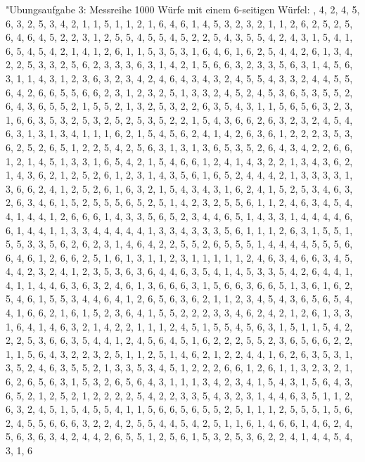\documentclass[fleqn,a4paper,12pt]{article}
\begin{document}
  "Ubungsaufgabe 3: \newline
  Messreihe 1000 Würfe mit einem 6-seitigen Würfel: , 4, 2, 4, 5, 6, 3, 2, 5, 3, 4, 2, 1, 1, 5, 1, 1, 2, 1, 6, 4, 6, 1, 4, 5, 3, 2, 3, 2, 1, 1, 2, 6, 2, 5, 2, 5, 6, 4, 6, 4, 5, 2, 2, 3, 1, 2, 5, 5, 4, 5, 5, 4, 5, 2, 2, 5, 4, 3, 5, 5, 4, 2, 4, 3, 1, 5, 4, 1, 6, 5, 4, 5, 4, 2, 1, 4, 1, 2, 6, 1, 1, 5, 3, 5, 3, 1, 6, 4, 6, 1, 6, 2, 5, 4, 4, 2, 6, 1, 3, 4, 2, 2, 5, 3, 3, 2, 5, 6, 2, 3, 3, 3, 6, 3, 1, 4, 2, 1, 5, 6, 6, 3, 2, 3, 3, 5, 6, 3, 1, 4, 5, 6, 3, 1, 1, 4, 3, 1, 2, 3, 6, 3, 2, 3, 4, 2, 4, 6, 4, 3, 4, 3, 2, 4, 5, 5, 4, 3, 3, 2, 4, 4, 5, 5, 6, 4, 2, 6, 6, 5, 5, 6, 6, 2, 3, 1, 2, 3, 2, 5, 1, 3, 3, 2, 4, 5, 2, 4, 5, 3, 6, 5, 3, 5, 5, 2, 6, 4, 3, 6, 5, 5, 2, 1, 5, 5, 2, 1, 3, 2, 5, 3, 2, 2, 6, 3, 5, 4, 3, 1, 1, 5, 6, 5, 6, 3, 2, 3, 1, 6, 6, 3, 5, 3, 2, 5, 3, 2, 5, 2, 5, 3, 5, 2, 2, 1, 5, 4, 3, 6, 6, 2, 6, 3, 2, 3, 2, 4, 5, 4, 6, 3, 1, 3, 1, 3, 4, 1, 1, 1, 6, 2, 1, 5, 4, 5, 6, 2, 4, 1, 4, 2, 6, 3, 6, 1, 2, 2, 2, 3, 5, 3, 6, 2, 5, 2, 6, 5, 1, 2, 2, 5, 4, 2, 5, 6, 3, 1, 3, 1, 3, 6, 5, 3, 5, 2, 6, 4, 3, 4, 2, 2, 6, 6, 1, 2, 1, 4, 5, 1, 3, 3, 1, 6, 5, 4, 2, 1, 5, 4, 6, 6, 1, 2, 4, 1, 4, 3, 2, 2, 1, 3, 4, 3, 6, 2, 1, 4, 3, 6, 2, 1, 2, 5, 2, 6, 1, 2, 3, 1, 4, 3, 5, 6, 1, 6, 5, 2, 4, 4, 4, 2, 1, 3, 3, 3, 3, 1, 3, 6, 6, 2, 4, 1, 2, 5, 2, 6, 1, 6, 3, 2, 1, 5, 4, 3, 4, 3, 1, 6, 2, 4, 1, 5, 2, 5, 3, 4, 6, 3, 2, 6, 3, 4, 6, 1, 5, 2, 5, 5, 5, 6, 5, 2, 5, 1, 4, 2, 3, 2, 5, 5, 6, 1, 1, 2, 4, 6, 3, 4, 5, 4, 4, 1, 4, 4, 1, 2, 6, 6, 6, 1, 4, 3, 3, 5, 6, 5, 2, 3, 4, 4, 6, 5, 1, 4, 3, 3, 1, 4, 4, 4, 4, 6, 6, 1, 4, 4, 1, 1, 3, 3, 4, 4, 4, 4, 4, 1, 3, 3, 4, 3, 3, 3, 5, 6, 1, 1, 1, 2, 6, 3, 1, 5, 5, 1, 5, 5, 3, 3, 5, 6, 2, 6, 2, 3, 1, 4, 6, 4, 2, 2, 5, 5, 2, 6, 5, 5, 5, 1, 4, 4, 4, 4, 5, 5, 5, 6, 6, 4, 6, 1, 2, 6, 6, 2, 5, 1, 6, 1, 3, 1, 1, 2, 3, 1, 1, 1, 1, 1, 2, 4, 6, 3, 4, 6, 6, 3, 4, 5, 4, 4, 2, 3, 2, 4, 1, 2, 3, 5, 3, 6, 3, 6, 4, 4, 6, 3, 5, 4, 1, 4, 5, 3, 3, 5, 4, 2, 6, 4, 4, 1, 4, 1, 1, 4, 4, 6, 3, 6, 3, 2, 4, 6, 1, 3, 6, 6, 6, 3, 1, 5, 6, 6, 3, 6, 6, 5, 1, 3, 6, 1, 6, 2, 5, 4, 6, 1, 5, 5, 3, 4, 4, 6, 4, 1, 2, 6, 5, 6, 3, 6, 2, 1, 1, 2, 3, 4, 5, 4, 3, 6, 5, 6, 5, 4, 4, 1, 6, 6, 2, 1, 6, 1, 5, 2, 3, 6, 4, 1, 5, 5, 2, 2, 2, 3, 3, 4, 6, 2, 4, 2, 1, 2, 6, 1, 3, 3, 1, 6, 4, 1, 4, 6, 3, 2, 1, 4, 2, 2, 1, 1, 1, 2, 4, 5, 1, 5, 5, 4, 5, 6, 3, 1, 5, 1, 1, 5, 4, 2, 2, 2, 5, 3, 6, 6, 3, 5, 4, 4, 1, 2, 4, 5, 6, 4, 5, 1, 6, 2, 2, 2, 5, 5, 2, 3, 6, 5, 6, 6, 2, 2, 1, 1, 5, 6, 4, 3, 2, 2, 3, 2, 5, 1, 1, 2, 5, 1, 4, 6, 2, 1, 2, 2, 4, 4, 1, 6, 2, 6, 3, 5, 3, 1, 3, 5, 2, 4, 6, 3, 5, 5, 2, 1, 3, 3, 5, 3, 4, 5, 1, 2, 2, 2, 6, 6, 1, 2, 6, 1, 1, 3, 2, 3, 2, 1, 6, 2, 6, 5, 6, 3, 1, 5, 3, 2, 6, 5, 6, 4, 3, 1, 1, 1, 3, 4, 2, 3, 4, 1, 5, 4, 3, 1, 5, 6, 4, 3, 6, 5, 2, 1, 2, 5, 2, 1, 2, 2, 2, 2, 5, 4, 2, 2, 3, 3, 5, 4, 3, 2, 3, 1, 4, 4, 6, 3, 5, 1, 1, 2, 6, 3, 2, 4, 5, 1, 5, 4, 5, 5, 4, 1, 1, 5, 6, 6, 5, 6, 5, 5, 2, 5, 1, 1, 1, 2, 5, 5, 5, 1, 5, 6, 2, 4, 5, 5, 6, 6, 6, 3, 2, 2, 4, 2, 5, 5, 4, 4, 5, 4, 2, 5, 1, 1, 6, 1, 4, 6, 6, 1, 4, 6, 2, 4, 5, 6, 3, 6, 3, 4, 2, 4, 4, 2, 6, 5, 5, 1, 2, 5, 6, 1, 5, 3, 2, 5, 3, 6, 2, 2, 4, 1, 4, 4, 5, 4, 3, 1, 6 \newline
\end{document}
